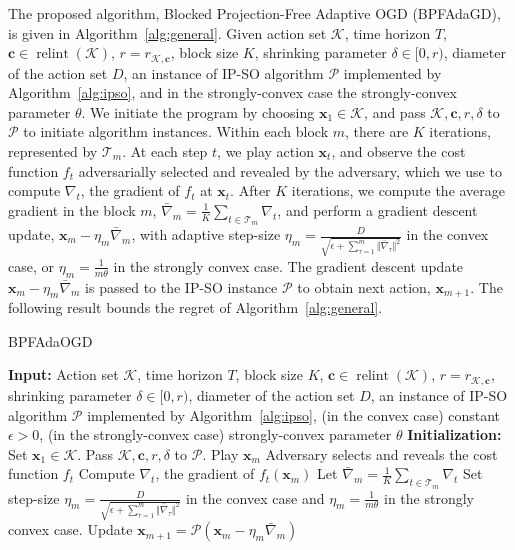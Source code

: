 \documentclass[twoside,11pt,]{article}
\newcommand{\op}[1]{\operatorname{#1}}
\newcommand{\C}[1]{\mathcal{#1}}
\newcommand{\BF}[1]{\mathbf{#1}}
\newcommand{\K}{\C{K}}
\newcommand{\x}{\BF{x}}
\newcommand{\bn}{\bar{\nabla}}
\begin{document}
The proposed algorithm, Blocked Projection-Free Adaptive OGD (BPFAdaGD), is given in Algorithm~\ref{alg:general}.
Given action set $\K$, time horizon $T$, $\BF{c} \in \op{relint}(\K)$, $r = r_{\K, \BF{c}}$, block size $K$, shrinking parameter $\delta\in[0,r)$, diameter of the action set $D$, an instance of IP-SO algorithm $\C{P}$ implemented by Algorithm~\ref{alg:ipso}, and in the strongly-convex case the strongly-convex parameter $\theta$.
We initiate the program by choosing $\x_1\in\K$, and pass $\K, \BF{c}, r, \delta$ to $\C{P}$ to initiate algorithm instances.
Within each block $m$, there are $K$ iterations, represented by $\C{T}_m$.
At each step $t$, we play action $\x_t$, and observe the cost function $f_t$ adversarially selected and revealed by the adversary, which we use to compute $\nabla_t$, the gradient of $f_t$ at $\x_t$.
After $K$ iterations, we compute the average gradient in the block $m$, $\bar{\nabla}_m=\frac{1}{K} \sum_{t\in\C{T}_m} \nabla_t $, and perform a gradient descent update, $\x_m - \eta_m\bar{\nabla}_m$, with adaptive step-size $\eta_m = \frac{D}{\sqrt{\epsilon + \sum^m_{\tau=1}\Vert \bar{\nabla}_\tau \Vert^2}}$ in the convex case, or $\eta_m = \frac{1}{m \theta}$ in the strongly convex case.
The gradient descent update $\x_m-\eta_m\bn_m$ is passed to the IP-SO instance $\C{P}$ to obtain next action, $\x_{m+1}$.
The following result bounds the regret of Algorithm~\ref{alg:general}. 


\begin{algorithm}[ht]
    \caption{ BPFAdaOGD }  
    \label{alg:general}
    \begin{algorithmic}[1]
        \STATE \textbf{Input:} Action set $\K$, time horizon $T$, block size $K$, $\BF{c} \in \op{relint}(\K)$, $r = r_{\K, \BF{c}}$, shrinking parameter $\delta\in[0,r)$, diameter of the action set $D$, an instance of IP-SO algorithm $\C{P}$ implemented by Algorithm~\ref{alg:ipso}, (in the convex case) constant $\epsilon > 0$, (in the strongly-convex case) strongly-convex parameter $\theta$
        \STATE \textbf{Initialization:} Set $\x_1 \in \K$. Pass $\K, \BF{c}, r, \delta$ to $\C{P}$.
            \FOR{$t \in \C{T}_m$}
                \STATE Play $\x_m$
                \STATE Adversary selects and reveals the cost function $f_t$
                \STATE Compute $\nabla_t$, the gradient of $f_t(\x_m)$
            \ENDFOR
            \STATE Let $\bar{\nabla}_m=\frac{1}{K} \sum_{t\in\C{T}_m} \nabla_t $
            \STATE Set step-size $\eta_m = \frac{D}{\sqrt{\epsilon + \sum^m_{\tau=1}\Vert \bar{\nabla}_\tau \Vert^2}}$ in the convex case and $\eta_m = \frac{1}{m \theta}$ in the strongly convex case.
            \STATE Update $\x_{m+1}=\C{P}(\x_m - \eta_m\bn_m)$
        \ENDFOR
    \end{algorithmic}
\end{algorithm}
\end{document}
